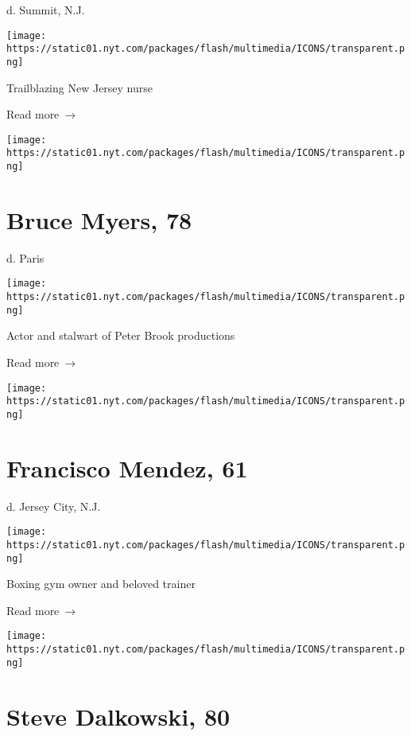 d. Summit, N.J.

\texttt{[image: https://static01.nyt.com/packages/flash/multimedia/ICONS/transparent.png]}

Trailblazing New Jersey nurse

 Read more~→

\href{https://www.nytimes.com/2020/04/27/theater/bruce-myers-dead-coronavirus.html}{}

\texttt{[image: https://static01.nyt.com/packages/flash/multimedia/ICONS/transparent.png]}

\hypertarget{bruce-myers-78}{%
\section{Bruce Myers, 78}\label{bruce-myers-78}}

d. Paris

\texttt{[image: https://static01.nyt.com/packages/flash/multimedia/ICONS/transparent.png]}

Actor and stalwart of Peter Brook productions

 Read more~→

\href{https://www.nytimes.com/2020/04/27/nyregion/francisco-mendez-dead-coronavirus.html}{}

\texttt{[image: https://static01.nyt.com/packages/flash/multimedia/ICONS/transparent.png]}

\hypertarget{francisco-mendez-61}{%
\section{Francisco Mendez, 61}\label{francisco-mendez-61}}

d. Jersey City, N.J.

\texttt{[image: https://static01.nyt.com/packages/flash/multimedia/ICONS/transparent.png]}

Boxing gym owner and beloved trainer

 Read more~→

\href{https://www.nytimes.com/2020/04/26/obituaries/steve-dalkowski-dead.html}{}

\texttt{[image: https://static01.nyt.com/packages/flash/multimedia/ICONS/transparent.png]}

\hypertarget{steve-dalkowski-80}{%
\section{Steve Dalkowski, 80}\label{steve-dalkowski-80}}

